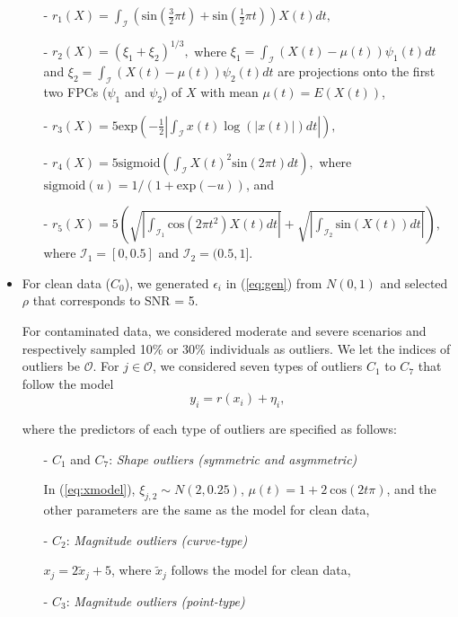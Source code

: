 \documentclass{article}
\let\oldref\ref
\renewcommand{\ref}[1]{(\oldref{#1})}
\begin{document}
\begin{itemize}
\begin{itemize}
\item[- ]  $r_1(X) =  \int_{\mathcal{I}} \left (\text{sin} \left(\frac{3}{2} \pi t \right) +  \text{sin} \left(\frac{1}{2} \pi t \right)\right)X(t)dt,$
\item[- ]  $r_2(X) = (\xi_1 + \xi_2)^{1/3},$ where  $\xi_1 = \int_{\mathcal{I}} (X(t) - \mu(t))\psi_1(t) dt$ and $\xi_2 = \int_{\mathcal{I}} (X(t) - \mu(t))\psi_2(t) dt$ are projections onto the first two FPCs ($\psi_1$ and $\psi_2$) of $X$ with mean $\mu(t) = E(X(t))$, 
\item[- ]  $r_3(X) = 5\text{exp}\left (- \frac{1}{2}\left| \int_{\mathcal{I}} x(t)\log(|x(t)|)dt \right| \right),$
\item[- ] 
$r_4(X) = 5\text{sigmoid}\left(\int_{\mathcal{I}}X(t)^2 \text{sin}(2\pi t) dt \right),$ where  $\text{sigmoid}(u) = 1/(1+ \text{exp}(-u))$, and
\item[- ] 
$r_5(X) = 5 \left( \sqrt{\left|\int_{\mathcal{I}_1} \text{cos}(2\pi t^2) X(t) dt \right|} + \sqrt{\left|\int_{\mathcal{I}_2} \text{sin}(X(t)) dt \right|} \right), $ where  $\mathcal{I}_1 = [0,0.5]$ and $\mathcal{I}_2 = (0.5,1]$. 
\end{itemize}

\item For clean data ($C_0$), we generated $\epsilon_i$ in \ref{eq:gen} from $N(0,1)$ and selected $\rho$ that corresponds to SNR = 5. 

For contaminated data, we considered moderate and severe  scenarios and  respectively sampled 10\% or 30\% individuals as outliers. We let the indices of outliers be $\mathcal{O}$.  For $j \in \mathcal{O}$, we considered seven types of outliers $C_1$ to $C_7$ that follow the model 
$$y_i = r(x_i) + \eta_i,$$

where the predictors of each type of outliers are specified as follows: 
\begin{itemize}
    \item[- ] $C_1$ and $C_7$: \textit{Shape outliers (symmetric and asymmetric)}
    
    \vspace{1ex}
    In \ref{eq:xmodel},   $\xi_{j,2} \sim N(2, 0.25)$, $\mu(t) = 1 + 2\ \text{cos}(2t\pi)$, and the other parameters are the same as the model for clean data,
    \vspace{1ex}
    \item[- ] $C_2$: \textit{Magnitude outliers (curve-type)}     \vspace{1ex}
    
    $x_{j} = 2 \tilde{x}_{j} + 5$, where $\tilde{x}_j$ follows the model for clean data,
       \vspace{1ex}
    \item[- ] $C_3$: \textit{Magnitude outliers (point-type)}
    

\end{itemize}
\end{itemize}
\end{document}
